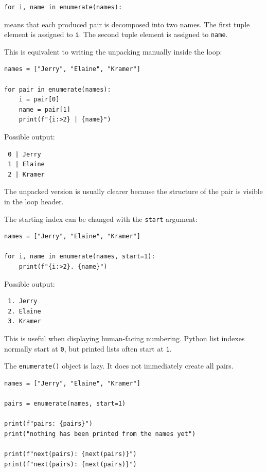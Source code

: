 \begin{verbatim}
for i, name in enumerate(names):
\end{verbatim}

means that each produced pair is decomposed into two names. The first tuple element is assigned to \texttt{i}. The second tuple element is assigned to \texttt{name}.

This is equivalent to writing the unpacking manually inside the loop:

\begin{verbatim}
names = ["Jerry", "Elaine", "Kramer"]

for pair in enumerate(names):
    i = pair[0]
    name = pair[1]
    print(f"{i:>2} | {name}")
\end{verbatim}

Possible output:

\begin{verbatim}
 0 | Jerry
 1 | Elaine
 2 | Kramer
\end{verbatim}

The unpacked version is usually clearer because the structure of the pair is visible in the loop header.

The starting index can be changed with the \texttt{start} argument:

\begin{verbatim}
names = ["Jerry", "Elaine", "Kramer"]

for i, name in enumerate(names, start=1):
    print(f"{i:>2}. {name}")
\end{verbatim}

Possible output:

\begin{verbatim}
 1. Jerry
 2. Elaine
 3. Kramer
\end{verbatim}

This is useful when displaying human-facing numbering. Python list indexes normally start at \texttt{0}, but printed lists often start at \texttt{1}.

The \texttt{enumerate()} object is lazy. It does not immediately create all pairs.

\begin{verbatim}
names = ["Jerry", "Elaine", "Kramer"]

pairs = enumerate(names, start=1)

print(f"pairs: {pairs}")
print("nothing has been printed from the names yet")

print(f"next(pairs): {next(pairs)}")
print(f"next(pairs): {next(pairs)}")
\end{verbatim}

